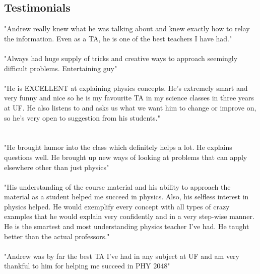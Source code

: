 \begin{resume}
    \section{\mysidestyle Testimonials}
              "Andrew really knew what he was talking about and knew exactly how to relay the information. Even as a TA, he is one of the best teachers I have had."
             \\ \\ "Always had huge supply of tricks and creative ways to approach seemingly difficult problems. Entertaining guy"
             \\ \\ "He is EXCELLENT at explaining physics concepts. He's extremely smart and very funny and nice so he is my favourite TA in my science classes in three years at UF. He also listens to and asks us what we want him to change or improve on, so he's very open to suggestion from his students."
             \\ \\ \\ "He brought humor into the class which definitely helps a lot. He explains questions well. He brought up new ways of looking at problems that can apply elsewhere other than just physics"
             \\ \\ "His understanding of the course material and his ability to approach the material as a student helped me succeed in physics. Also, his selfless interest in physics helped. He would exemplify every concept with all types of crazy examples that he would explain very confidently and in a very step-wise manner. He is the smartest and most understanding physics teacher I've had. He taught better than the actual professors."
             \\ \\ "Andrew was by far the best TA I've had in any subject at UF and am very thankful to him for helping me succeed in PHY 2048"
\end{resume}


